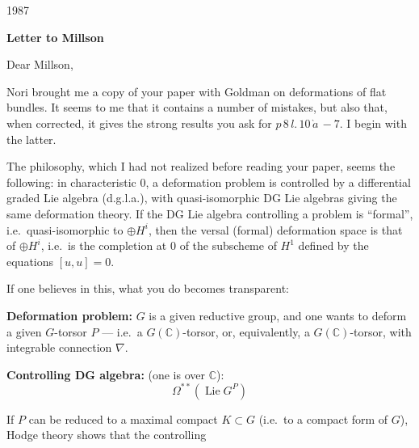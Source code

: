 \documentclass[11pt,a4paper]{article}
\begin{document}
\begin{flushright}
1987
\end{flushright}

\vspace{1cm}

\begin{center}
\Large\textbf{Letter to Millson}
\end{center}

\vspace{0.5cm}

\noindent Dear Millson,

\vspace{0.5cm}

Nori brought me a copy of your paper with Goldman on deformations of flat bundles. It seems to me that it contains a number of mistakes, but also that, when corrected, it gives the strong results you ask for $p\,8\,l.\,10\,\grave{a}\,-7$. I begin with the latter.

\vspace{0.3cm}

The philosophy, which I had not realized before reading your paper, seems the following: in characteristic $0$, a deformation problem is controlled by a differential graded Lie algebra (d.g.l.a.), with quasi-isomorphic DG Lie algebras giving the same deformation theory. If the DG Lie algebra controlling a problem is ``formal'', i.e.\ quasi-isomorphic to $\oplus H^i$, then the versal (formal) deformation space is that of $\oplus H^i$, i.e.\ is the completion at $0$ of the subscheme of $H^1$ defined by the equations $[u,u]=0$.

\vspace{0.3cm}

If one believes in this, what you do becomes transparent:

\vspace{0.2cm}

\noindent\textbf{Deformation problem:} $G$ is a given reductive group, and one wants to deform a given $G$-torsor $P$ --- i.e.\ a $G(\mathbb{C})$-torsor, or, equivalently, a $G(\mathbb{C})$-torsor, with integrable connection $\nabla$.

\vspace{0.2cm}

\noindent\textbf{Controlling DG algebra:} (one is over $\mathbb{C}$):
\[
\Omega^{**}(\operatorname{Lie} G^P)
\]

If $P$ can be reduced to a maximal compact $K \subset G$ (i.e.\ to a compact form of $G$), Hodge theory shows that the controlling
\end{document}
